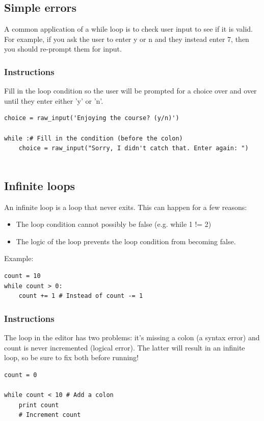 \documentclass[12pt,a4paper,final,twoside,onecolumn,titlepage]{book}
\begin{document}
\subsection{Simple errors}

A common application of a while loop is to check user input to see if it is valid. For example, if you ask the user to enter y or n and they instead enter 7, then you should re-prompt them for input.
\subsubsection{Instructions}

Fill in the loop condition so the user will be prompted for a choice over and over until they enter either 'y' or 'n'.
\begin{lstlisting}
choice = raw_input('Enjoying the course? (y/n)')

while :# Fill in the condition (before the colon)
    choice = raw_input("Sorry, I didn't catch that. Enter again: ")


\end{lstlisting}
\subsection{Infinite loops}

An infinite loop is a loop that never exits. This can happen for a few reasons:
\begin{itemize}
\item    The loop condition cannot possibly be false (e.g. while 1 != 2)

\item    The logic of the loop prevents the loop condition from becoming false.
\end{itemize}
Example:
\begin{lstlisting}
count = 10
while count > 0:
    count += 1 # Instead of count -= 1
\end{lstlisting}
\subsubsection{Instructions}

The loop in the editor has two problems: it's missing a colon (a syntax error) and count is never incremented (logical error). The latter will result in an infinite loop, so be sure to fix both before running!
\begin{lstlisting}
count = 0

while count < 10 # Add a colon
    print count
    # Increment count
\end{lstlisting}
\end{document}
